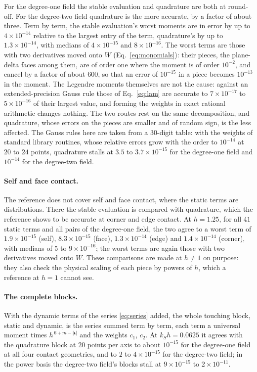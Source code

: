 \documentclass[11pt,a4paper]{article}
\newcommand{\biota}{\boldsymbol{\iota}}
\begin{document}
For the degree-one field the stable evaluation and quadrature are both at round-off. For the degree-two
field quadrature is the more accurate, by a factor of about three. Term by term, the stable evaluation's
worst moments are in error by up to $4\times10^{-14}$ relative to the largest entry of the term, quadrature's
by up to $1.3\times10^{-14}$, with medians of $4\times10^{-15}$ and $8\times10^{-16}$. The worst terms are those
with two derivatives moved onto $W$ (Eq.~\eqref{eq:monomials}): their pieces, the plane-delta faces among
them, are of order one where the moment is of order $10^{-2}$, and cancel by a factor of about $600$, so that
an error of $10^{-15}$ in a piece becomes $10^{-13}$ in the moment. The Legendre moments themselves are not the
cause: against an extended-precision Gauss rule those of Eq.~\eqref{eq:lam} are accurate to
$7\times10^{-17}$ to $5\times10^{-16}$ of their largest value, and forming the weights in exact rational
arithmetic changes nothing. The two routes rest on the same decomposition, and quadrature, whose errors on
the pieces are smaller and of random sign, is the less affected. The Gauss rules here are taken from a
$30$-digit table: with the weights of standard library routines, whose relative errors grow with the
order to $10^{-14}$ at $20$ to $24$ points, quadrature stalls at $3.5$ to $3.7\times10^{-15}$ for the
degree-one field and $10^{-14}$ for the degree-two field.

\paragraph{Self and face contact.} The reference does not cover self and face contact, where the static
terms are distributions. There the stable evaluation is compared with quadrature, which the reference
shows to be accurate at corner and edge contact. At $h=1.25$, for all $41$ static terms and all pairs of
the degree-one field, the two agree to a worst term of $1.9\times10^{-15}$ (self), $8.3\times10^{-15}$ (face),
$1.3\times10^{-14}$ (edge) and $1.4\times10^{-14}$ (corner), with medians of $5$ to $9\times10^{-16}$; the worst
terms are again those with two derivatives moved onto $W$.
These comparisons are made at $h\ne1$ on purpose: they also check the physical scaling of each piece by
powers of $h$, which a reference at $h=1$ cannot see.

\paragraph{The complete blocks.} With the dynamic terms of the series \eqref{eq:series} added, the
whole touching block, static and dynamic, is the series summed term by term, each term a universal moment
times $h^{\,6+m-|\biota|}$ and the weights $c_1$, $c_2$. At $k_Sh=0.0625$ it agrees with the quadrature
block at $20$ points per axis to about $10^{-15}$ for the degree-one field at all four contact geometries, and
to $2$ to $4\times10^{-15}$ for the degree-two field; in the power basis the degree-two field's
blocks stall at $9\times10^{-15}$ to $2\times10^{-11}$.
\end{document}

